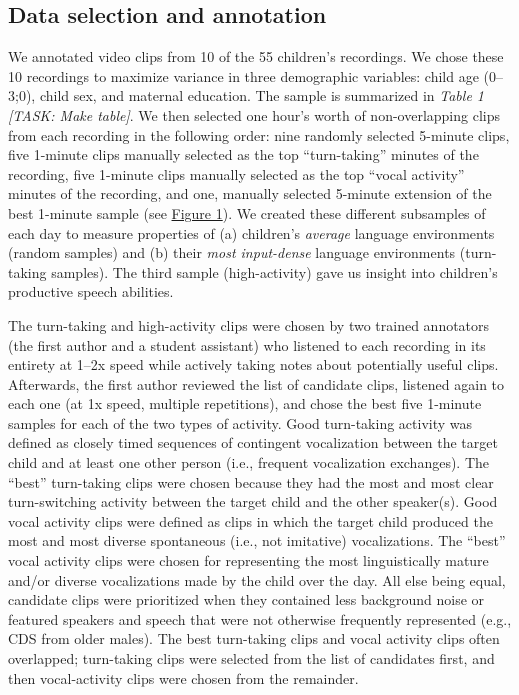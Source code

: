 \documentclass[floatsintext,man]{apa6}
\theoremstyle{definition}
\theoremstyle{definition}
\theoremstyle{definition}
\theoremstyle{remark}
\begin{document}
\subsection{Data selection and annotation}\label{methods-samples}

We annotated video clips from 10 of the 55 children's recordings. We
chose these 10 recordings to maximize variance in three demographic
variables: child age (0--3;0), child sex, and maternal education. The
sample is summarized in \emph{Table 1} \emph{{[}TASK: Make table{]}}. We
then selected one hour's worth of non-overlapping clips from each
recording in the following order: nine randomly selected 5-minute clips,
five 1-minute clips manually selected as the top \enquote{turn-taking}
minutes of the recording, five 1-minute clips manually selected as the
top \enquote{vocal activity} minutes of the recording, and one, manually
selected 5-minute extension of the best 1-minute sample (see
\protect\hyperlink{fig1}{Figure 1}). We created these different
subsamples of each day to measure properties of (a) children's
\emph{average} language environments (random samples) and (b) their
\emph{most input-dense} language environments (turn-taking samples). The
third sample (high-activity) gave us insight into children's productive
speech abilities.

The turn-taking and high-activity clips were chosen by two trained
annotators (the first author and a student assistant) who listened to
each recording in its entirety at 1--2x speed while actively taking
notes about potentially useful clips. Afterwards, the first author
reviewed the list of candidate clips, listened again to each one (at 1x
speed, multiple repetitions), and chose the best five 1-minute samples
for each of the two types of activity. Good turn-taking activity was
defined as closely timed sequences of contingent vocalization between
the target child and at least one other person (i.e., frequent
vocalization exchanges). The \enquote{best} turn-taking clips were
chosen because they had the most and most clear turn-switching activity
between the target child and the other speaker(s). Good vocal activity
clips were defined as clips in which the target child produced the most
and most diverse spontaneous (i.e., not imitative) vocalizations. The
\enquote{best} vocal activity clips were chosen for representing the
most linguistically mature and/or diverse vocalizations made by the
child over the day. All else being equal, candidate clips were
prioritized when they contained less background noise or featured
speakers and speech that were not otherwise frequently represented
(e.g., CDS from older males). The best turn-taking clips and vocal
activity clips often overlapped; turn-taking clips were selected from
the list of candidates first, and then vocal-activity clips were chosen
from the remainder.
\end{document}
